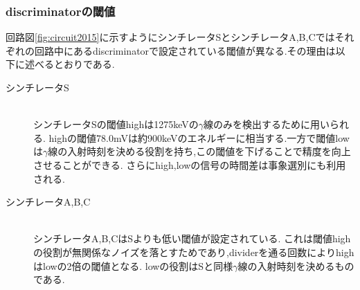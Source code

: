 \subsubsection{discriminatorの閾値}
回路図\ref{fig:circuit2015}に示すようにシンチレータSとシンチレータA,B,Cではそれぞれの回路中にあるdiscriminatorで設定されている閾値が異なる.その理由は以下に述べるとおりである.
\begin{description}
	\item[シンチレータS]\mbox{}\\
		シンチレータSの閾値highは1275keVの$\gamma$線のみを検出するために用いられる.
		highの閾値78.0mVは約900keVのエネルギーに相当する.一方で閾値lowは$\gamma$線の入射時刻を決める役割を持ち,この閾値を下げることで精度を向上させることができる.
		さらにhigh,lowの信号の時間差は事象選別にも利用される.
	\item[シンチレータA,B,C]\mbox{}\\
		シンチレータA,B,CはSよりも低い閾値が設定されている.
		これは閾値highの役割が無関係なノイズを落とすためであり,dividerを通る回数によりhighはlowの2倍の閾値となる.
		lowの役割はSと同様$\gamma$線の入射時刻を決めるものである.
\end{description}


